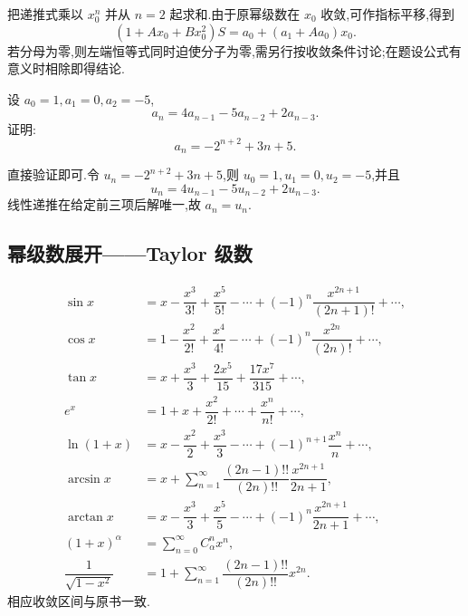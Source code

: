 \begin{solution}
    把递推式乘以 $x_0^n$ 并从 $n=2$ 起求和.由于原幂级数在 $x_0$ 收敛,可作指标平移,得到
    \[
        (1+Ax_0+Bx_0^2)S=a_0+(a_1+Aa_0)x_0.
    \]
    若分母为零,则左端恒等式同时迫使分子为零,需另行按收敛条件讨论;在题设公式有意义时相除即得结论.
\end{solution}

\begin{example}
    设 $a_0=1,a_1=0,a_2=-5$,
    \[
        a_n=4a_{n-1}-5a_{n-2}+2a_{n-3}.
    \]
    证明:
    \[
        a_n=-2^{n+2}+3n+5.
    \]
\end{example}
\exampleblank

\begin{solution}
    直接验证即可.令 $u_n=-2^{n+2}+3n+5$,则
    $u_0=1,u_1=0,u_2=-5$,并且
    \[
        u_n=4u_{n-1}-5u_{n-2}+2u_{n-3}.
    \]
    线性递推在给定前三项后解唯一,故 $a_n=u_n$.
\end{solution}



\subsection{幂级数展开——Taylor 级数}

\begin{theorem}
    \begin{align*}
        \sin x                  & =x-\dfrac{x^3}{3!}+\dfrac{x^5}{5!}-\cdots+(-1)^n\dfrac{x^{2n+1}}{(2n+1)!}+\cdots, \\
        \cos x                  & =1-\dfrac{x^2}{2!}+\dfrac{x^4}{4!}-\cdots+(-1)^n\dfrac{x^{2n}}{(2n)!}+\cdots,     \\
        \tan x                  & =x+\dfrac{x^3}{3}+\dfrac{2x^5}{15}+\dfrac{17x^7}{315}+\cdots,                     \\
        e^x                     & =1+x+\dfrac{x^2}{2!}+\cdots+\dfrac{x^n}{n!}+\cdots,                               \\
        \ln(1+x)                & =x-\dfrac{x^2}{2}+\dfrac{x^3}{3}-\cdots+(-1)^{n+1}\dfrac{x^n}{n}+\cdots,          \\
        \arcsin x               & =x+\sum\limits_{n=1}^{\infty}\dfrac{(2n-1)!!}{(2n)!!}\dfrac{x^{2n+1}}{2n+1},      \\
        \arctan x               & =x-\dfrac{x^3}{3}+\dfrac{x^5}{5}-\cdots+(-1)^n\dfrac{x^{2n+1}}{2n+1}+\cdots,      \\
        (1+x)^\alpha            & =\sum\limits_{n=0}^{\infty}C_{\alpha}^{n}x^n,                                     \\
        \dfrac{1}{\sqrt{1-x^2}} & =1+\sum\limits_{n=1}^{\infty}\dfrac{(2n-1)!!}{(2n)!!}x^{2n}.
    \end{align*}
    相应收敛区间与原书一致.
\end{theorem}

